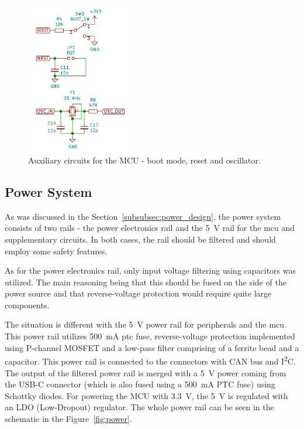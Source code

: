 \begin{figure}[H]
    \centering
    \includegraphics[width=0.4\textwidth]{obrazky/schem_mcu_aux}
    \caption{Auxiliary circuits for the MCU - boot mode, reset and oscillator.}
    \label{fig:schem_mcu_aux}
\end{figure}

\subsection{Power System}
\label{subsec:power_system}
As was discussed in the Section~\ref{subsubsec:power_design}, the power system consists of two rails - the power electronics rail and the 5~V rail for the \acs{mcu} and supplementary circuits.
In both cases, the rail should be filtered and should employ some safety features.

As for the power electronics rail, only input voltage filtering using capacitors was utilized.
The main reasoning being that this should be fused on the side of the power source and that reverse-voltage protection would require quite large components.

The situation is different with the 5~V power rail for peripherals and the \acs{mcu}.
This power rail utilizes 500~mA \acs{ptc} fuse, reverse-voltage protection implemented using P-channel MOSFET and a low-pass filter comprising of a ferrite bead and a capacitor.
This power rail is connected to the connectors with CAN bus and I\textsuperscript{2}C.
The output of the filtered power rail is merged with a 5~V power coming from the USB-C connector (which is also fused using a 500~mA PTC fuse) using Schottky diodes.
For powering the MCU with 3.3~V, the 5~V is regulated with an LDO (Low-Dropout) regulator.
The whole power rail can be seen in the schematic in the Figure~\ref{fig:power}.

